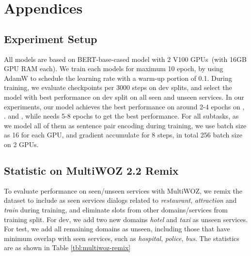\section{Appendices}
\label{sec:appendix}

\subsection{Experiment Setup}
\label{ssec:exp-setup}
All models are based on BERT-base-cased model with 2 V100 GPUs~(with
16GB GPU RAM each). We train each models for maximum 10 epoch, by
using AdamW to schedule the learning rate with a warm-up portion of
0.1. During training, we evaluate checkpoints per 3000 steps on dev
splits, and select the model with best performance on dev split on all
seen and unseen services. In our experiments, our model achieves the
best performance on around 2-4 epochs on \IC, \RSI. and \CSL, while
\NSL needs 5-8 epochs to get the best performance. For all subtasks, as
we model all of them as sentence pair encoding during training, we use
batch size as 16 for each GPU, and gradient accumulate for 8 steps, in
total 256 batch size on 2 GPUs.


\subsection{Statistic on MultiWOZ 2.2 Remix}
\label{ssec:appendices-multiwoz-dataset}
To evaluate performance on seen/unseen services with MultiWOZ, we
remix the \multiwoz dataset to include as seen services dialogs
related to \textit{restaurant}, \textit{attraction} and \textit{train}
during training, and eliminate slots from other domains/services from
training split.  For dev, we add two new domains {\it hotel} and {\it
  taxi} as unseen services. For test, we add all remaining domains as
unseen, including those that have minimum overlap with seen services,
such as {\it hospital}, {\it police}, {\it bus}. The statistics are as shown in Table \ref{tbl:multiwoz-remix}

